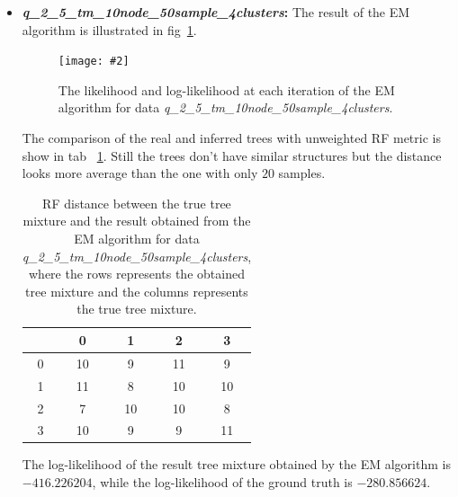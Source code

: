 \documentclass[11pt]{extarticle}
\newcommand{\0}{\mathbf{0}}
\renewcommand{\(}{\left(}
\renewcommand{\)}{\right)}
\theoremstyle{definition}
\newcommand{\image}[3]{
	\begin{figure}[!ht]
		\centering
	    \texttt{[image: \#2]}
		\caption{#3}
		\label{fig:#2}
	\end{figure}
}
\begin{document}
\begin{itemize}
	\item \textbf{\textit{q\_2\_5\_tm\_10node\_50sample\_4clusters}:} The result of the EM algorithm is illustrated in fig~\ref{fig:D10_N50_K4}.
	\image{0.9}{D10_N50_K4}{The likelihood and log-likelihood at each iteration of the EM algorithm for data \textit{q\_2\_5\_tm\_10node\_50sample\_4clusters}.}
	\par The comparison of the real and inferred trees with unweighted RF metric is show in tab~ \ref{tab:RF_D10_N50_K4}. Still the trees don't have similar structures but the distance looks more average than the one with only $20$ samples.
	\begin{table}[!ht]
		\centering
		\caption{RF distance between the true tree mixture and the result obtained from the EM algorithm for data \textit{q\_2\_5\_tm\_10node\_50sample\_4clusters}, where the rows represents the obtained tree mixture and the columns represents the true tree mixture.}
		\begin{tabular}{c|cccc}
			 & 0 & 1 & 2 & 3 \\
			 \hline
			 0 & 10 & 9 & 11 & 9 \\
			 1 & 11 & 8 & 10 & 10 \\
			 2 & 7 & 10 & 10 & 8 \\
			 3 & 10 & 9 & 9 & 11
		\end{tabular}
		\label{tab:RF_D10_N50_K4}
	\end{table}
	\par The log-likelihood of the result tree mixture obtained by the EM algorithm is $-416.226204$, while the log-likelihood of the ground truth is $-280.856624$.
	

\end{itemize}
\end{document}
